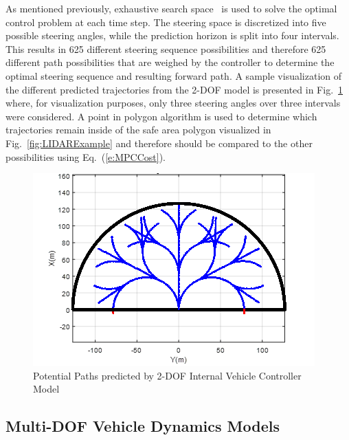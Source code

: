 \documentclass[12pt,onecolumn]{article}
\begin{document}
As mentioned previously, exhaustive search space~\cite{ModelFidelity2016} is used to solve the optimal control problem at each time step. The steering space is discretized into five possible steering angles, while the prediction horizon is split into four intervals. This results in 625 different steering sequence possibilities and therefore 625 different path possibilities that are weighed by the controller to determine the optimal steering sequence and resulting forward path. A sample visualization of the different predicted trajectories from the 2-DOF model is presented in Fig.~\ref{fig:PossiblePaths} where, for visualization purposes, only three steering angles over three intervals were considered. A point in polygon algorithm is used to determine which trajectories remain inside of the safe area polygon visualized in Fig.~\ref{fig:LIDARExample} and therefore should be compared to the other possibilities using Eq.~(\ref{e:MPCCost}).

\begin{figure}
	\centering
	\includegraphics[width=\columnwidth]{Figs/PathPossibilities.png}
	\caption{\small Potential Paths predicted by 2-DOF Internal Vehicle Controller Model}  
	\label{fig:PossiblePaths}
\end{figure}

 

\subsection{Multi-DOF Vehicle Dynamics Models}\label{ss:IntModel}
\end{document}
